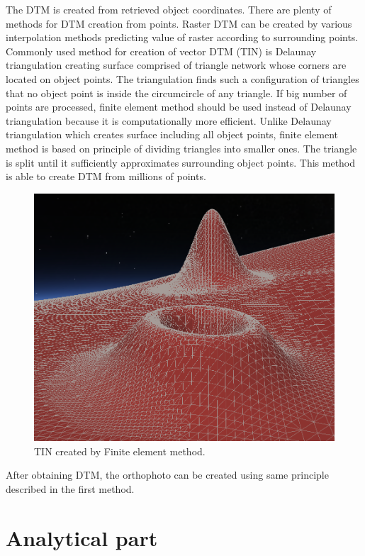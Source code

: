 \documentclass[a4paper,12pt]{article}
\begin{document}
The DTM is created from retrieved object coordinates. There 
are plenty of methods for DTM creation from points. Raster DTM can be created by various interpolation methods 
predicting value of raster according to surrounding points. Commonly used method for  creation of 
vector DTM (TIN) is Delaunay triangulation creating surface comprised of triangle network whose corners are located 
on object points. The triangulation finds such a configuration of triangles that no object 
point is inside the circumcircle of any triangle.
If big number of points are processed, finite element method 
should be used instead of Delaunay triangulation because it is computationally more efficient.
Unlike Delaunay triangulation which creates surface including all object points, finite element method
is based on principle of dividing triangles into smaller ones. 
The triangle is split until it sufficiently approximates surrounding object points. 
This method is able to create DTM from millions of points.

\begin{figure}[h]
    \centering
    \includegraphics[scale=0.2]{figures/finite_elements.png}
    \caption{TIN created by Finite element method.}
    \label{fig:rel_or_amb}
\end{figure}

After obtaining DTM, the orthophoto can be created using same principle described in the first method. 


\section{Analytical part}
\end{document}
